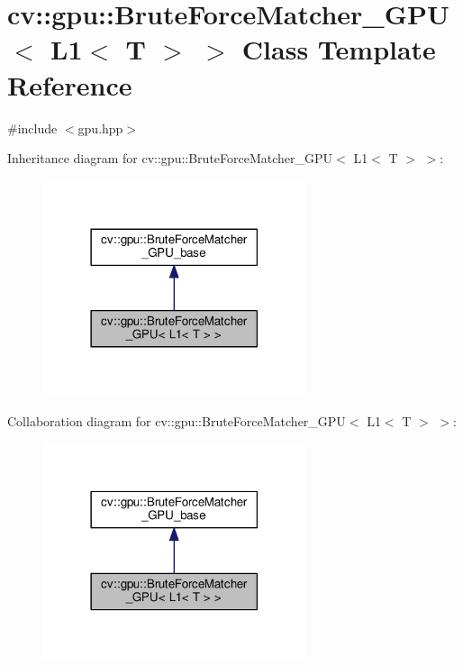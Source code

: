 \hypertarget{classcv_1_1gpu_1_1BruteForceMatcher__GPU_3_01L1_3_01T_01_4_01_4}{\section{cv\-:\-:gpu\-:\-:Brute\-Force\-Matcher\-\_\-\-G\-P\-U$<$ L1$<$ T $>$ $>$ Class Template Reference}
\label{classcv_1_1gpu_1_1BruteForceMatcher__GPU_3_01L1_3_01T_01_4_01_4}
}


{\ttfamily \#include $<$gpu.\-hpp$>$}



Inheritance diagram for cv\-:\-:gpu\-:\-:Brute\-Force\-Matcher\-\_\-\-G\-P\-U$<$ L1$<$ T $>$ $>$\-:\nopagebreak
\begin{figure}[H]
\begin{center}
\leavevmode
\includegraphics[width=218pt]{classcv_1_1gpu_1_1BruteForceMatcher__GPU_3_01L1_3_01T_01_4_01_4__inherit__graph}
\end{center}
\end{figure}


Collaboration diagram for cv\-:\-:gpu\-:\-:Brute\-Force\-Matcher\-\_\-\-G\-P\-U$<$ L1$<$ T $>$ $>$\-:\nopagebreak
\begin{figure}[H]
\begin{center}
\leavevmode
\includegraphics[width=218pt]{classcv_1_1gpu_1_1BruteForceMatcher__GPU_3_01L1_3_01T_01_4_01_4__coll__graph}
\end{center}
\end{figure}
